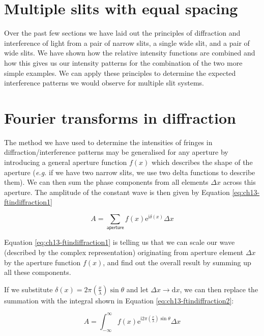 \documentclass[
]{book}
\begin{document}
\hypertarget{sec:ch13-diffmultipleslits}{%
\section{Multiple slits with equal spacing}\label{sec:ch13-diffmultipleslits}}

Over the past few sections we have laid out the principles of diffraction and interference of light from a pair of narrow slits, a single wide slit, and a pair of wide slits. We have shown how the relative intensity functions are combined and how this gives us our intensity patterns for the combination of the two more simple examples. We can apply these principles to determine the expected interference patterns we would observe for multiple slit systems.

\hypertarget{sec:ch13-ftindiffraction}{%
\section{Fourier transforms in diffraction}\label{sec:ch13-ftindiffraction}}

The method we have used to determine the intensities of fringes in diffraction/interference patterns may be generalised for any aperture by introducing a general aperture function \(f(x)\) which describes the shape of the aperture (\emph{e.g.} if we have two narrow slits, we use two delta functions to describe them). We can then sum the phase components from all elements \(\Delta x\) across this aperture. The amplitude of the constant wave is then given by Equation \eqref{eq:ch13-ftindiffraction1}

\begin{equation}
A = \sum_{\textsf{aperture}} f(x) \mathrm{e}^{\mathrm{i}\delta(x)} \Delta x
\label{eq:ch13-ftindiffraction1}
\end{equation}

Equation \eqref{eq:ch13-ftindiffraction1} is telling us that we can scale our wave (described by the complex representation) originating from aperture element \(\Delta x\) by the aperture function \(f(x)\), and find out the overall result by summing up all these components.

If we substitute \(\delta(x) = 2\pi \left(\frac{x}{\lambda}\right) \sin \theta\) and let \(\Delta x \rightarrow \mathrm{d}x\), we can then replace the summation with the integral shown in Equation \eqref{eq:ch13-ftindiffraction2}:

\begin{equation}
A = \int_{-\infty}^{\infty} f(x) \mathrm{e}^{\mathrm{i}2\pi \left(\frac{x}{\lambda}\right) \sin \theta} \Delta x
\label{eq:ch13-ftindiffraction2}
\end{equation}
\end{document}
